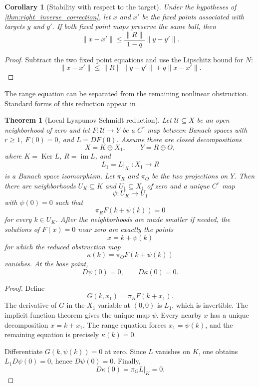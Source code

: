 \documentclass[11pt,a4paper]{article}
\newtheorem{theorem}{Theorem}[section]
\theoremstyle{plain}
\newtheorem{corollary}[corollary]{Corollary}
\theoremstyle{definition}
\theoremstyle{remark}
\newcommand{\im}{\operatorname{im}}
\newcommand{\Ker}{\operatorname{Ker}}
\begin{document}
\begin{corollary}[Stability with respect to the target]\label{cor:correction_stability}
Under the hypotheses of \cref{thm:right_inverse_correction}, let $x$ and $x'$ be the fixed points associated with targets $y$ and $y'$.  If both fixed point maps preserve the same ball, then
\[
\|x-x'\|
\le
\frac{\|R\|}{1-q}\|y-y'\|.
\]
\end{corollary}

\begin{proof}
Subtract the two fixed point equations and use the Lipschitz bound for $N$:
\[
\|x-x'\|
\le
\|R\|\|y-y'\|+q\|x-x'\|.
\]
\end{proof}

The range equation can be separated from the remaining nonlinear obstruction.  Standard forms of this reduction appear in \cite{Kielhoefer2012,Zeidler1986}.

\begin{theorem}[Local Lyapunov Schmidt reduction]\label{thm:lyapunov_schmidt}
Let $\mathcal U\subseteq X$ be an open neighborhood of zero and let $F:\mathcal U\to Y$ be a $C^r$ map between Banach spaces with $r\ge1$, $F(0)=0$, and $L=DF(0)$.  Assume there are closed decompositions
\[
X=K\oplus X_1,
\qquad
Y=R\oplus O,
\]
where $K=\Ker L$, $R=\im L$, and
\[
L_1=L|_{X_1}:X_1\longrightarrow R
\]
is a Banach space isomorphism.  Let $\pi_R$ and $\pi_O$ be the two projections on $Y$.  Then there are neighborhoods $U_K\subseteq K$ and $U_1\subseteq X_1$ of zero and a unique $C^r$ map
\[
\psi:U_K\longrightarrow U_1
\]
with $\psi(0)=0$ such that
\[
\pi_RF(k+\psi(k))=0
\]
for every $k\in U_K$.  After the neighborhoods are made smaller if needed, the solutions of $F(x)=0$ near zero are exactly the points
\[
x=k+\psi(k)
\]
for which the reduced obstruction map
\[
\kappa(k)=\pi_OF(k+\psi(k))
\]
vanishes.  At the base point,
\[
D\psi(0)=0,
\qquad
D\kappa(0)=0.
\]
\end{theorem}

\begin{proof}
Define
\[
G(k,x_1)=\pi_RF(k+x_1).
\]
The derivative of $G$ in the $X_1$ variable at $(0,0)$ is $L_1$, which is invertible.  The implicit function theorem gives the unique map $\psi$.  Every nearby $x$ has a unique decomposition $x=k+x_1$.  The range equation forces $x_1=\psi(k)$, and the remaining equation is precisely $\kappa(k)=0$.

Differentiate $G(k,\psi(k))=0$ at zero.  Since $L$ vanishes on $K$, one obtains $L_1D\psi(0)=0$, hence $D\psi(0)=0$.  Finally,
\[
D\kappa(0)=\pi_OL|_K=0.
\]
\end{proof}
\end{document}
